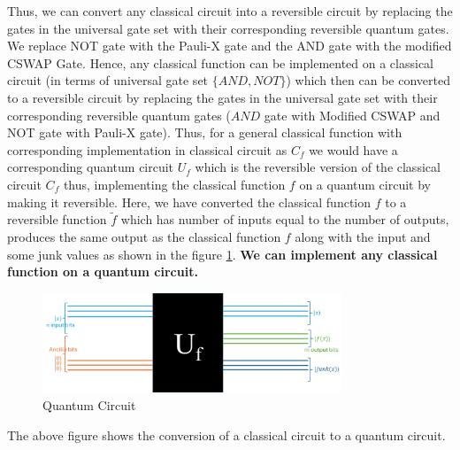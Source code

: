 \documentclass[12pt, oneside]{book}
\theoremstyle{definition}
\theoremstyle{definition}
\theoremstyle{remark}
\begin{document}
Thus, we can convert any classical circuit into a reversible circuit by replacing the gates in the universal gate set with their corresponding reversible quantum gates.
We replace NOT gate with the Pauli-X gate and the AND gate with the modified CSWAP Gate. 
Hence, any classical function can be implemented on a classical circuit (in terms of universal gate set $\{AND,NOT\}$) which then can be converted to a reversible circuit by replacing the gates in the universal gate set with their corresponding reversible quantum gates
($AND$ gate with Modified CSWAP and NOT gate with Pauli-X gate). Thus, for a general classical function with corresponding implementation in classical circuit as $C_f$ we would have a corresponding
quantum circuit $U_f$ which is the reversible version of the classical circuit $C_f$ thus, implementing the classical function $f$ on a quantum circuit by making it reversible. Here, we have converted the classical function $f$ to a reversible function $\tilde{f}$ which has number of inputs equal to the number of outputs, 
produces the same output as the classical function $f$ along with the input and some junk values as shown in the figure \ref{fig:classicaltoquantum}. \textbf{We can implement any classical function on a quantum circuit.}
\begin{figure}
    \centering
    \includegraphics[width=0.8\textwidth]{../images/classicaltoquantum.png}
    \caption{Quantum Circuit}
    \label{fig:classicaltoquantum}
\end{figure}
The above figure shows the conversion of a classical circuit to a quantum circuit. 
\end{document}
